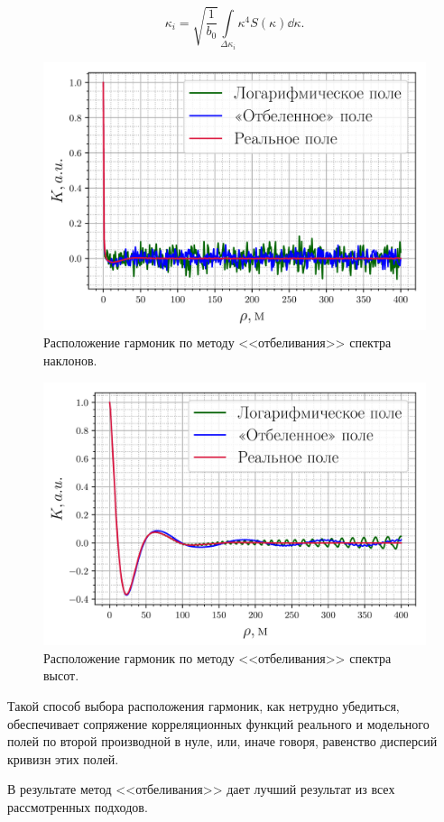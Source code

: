 \begin{equation}
    \label{eq:ki_slopes}
    \boxed{
        \kappa_i = \sqrt{\frac{1}{b_0}} \int\limits_{\Delta \kappa_i}
        \kappa^4 S(\kappa) \dd \kappa. 
    }
\end{equation}

\begin{figure}[ht]
    \centering
    \includegraphics[width=0.6\linewidth]{fig/correlation_angles_wa.png}
    \caption{ Расположение гармоник по методу <<отбеливания>> спектра
    наклонов. }
    \label{fig:nodes}
\end{figure}

\begin{figure}[ht]
    \centering
    \includegraphics[width=0.6\linewidth]{fig/correlation_height_wa.png}
    \caption{ Расположение гармоник по методу <<отбеливания>> спектра
    высот. }
\end{figure}
Такой способ выбора расположения гармоник, как нетрудно убедиться, обеспечивает
сопряжение корреляционных функций реального и модельного полей по второй
производной в нуле, или, иначе говоря, равенство дисперсий кривизн этих
полей.

В результате метод <<отбеливания>> дает лучший результат из всех рассмотренных подходов. 

